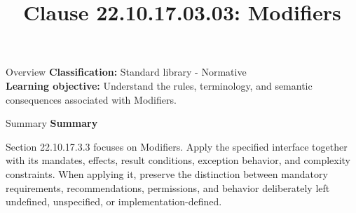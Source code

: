 \documentclass[10pt,letterpaper]{article}
\title{Clause 22.10.17.03.03: Modifiers}
\author{}
\date{}
\begin{document}
\maketitle
\begin{CornellOverviewBox}{Overview}
\textbf{Classification:} Standard library - Normative\\[2pt]
\textbf{Learning objective:} Understand the rules, terminology, and semantic consequences associated with Modifiers.
\end{CornellOverviewBox}\begin{CornellSummaryBox}{Summary}
{\sffamily\bfseries\color{Accent} Summary}\par\vspace{3pt}Section 22.10.17.3.3 focuses on Modifiers. Apply the specified interface together with its mandates, effects, result conditions, exception behavior, and complexity constraints. When applying it, preserve the distinction between mandatory requirements, recommendations, permissions, and behavior deliberately left undefined, unspecified, or implementation-defined.
\end{CornellSummaryBox}
\end{document}
